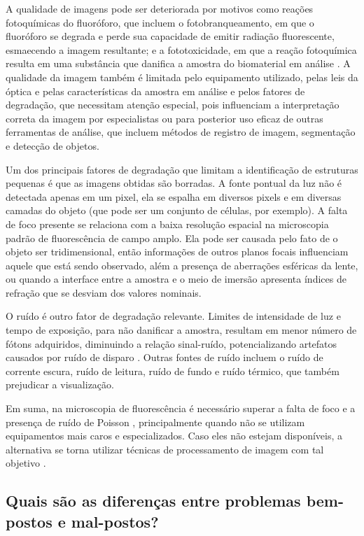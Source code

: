 A qualidade de imagens pode ser deteriorada por motivos como reações fotoquímicas do fluoróforo, que incluem o fotobranqueamento, em que o fluoróforo se degrada e perde sua capacidade de emitir radiação fluorescente, esmaecendo a imagem resultante; e a fototoxicidade, em que a reação fotoquímica resulta em uma substância que danifica a amostra do biomaterial em análise \cite{kubitscheck2017fluorescence}. A qualidade da imagem também é limitada pelo equipamento utilizado, pelas leis da óptica e pelas características da amostra em análise e pelos fatores de degradação, que necessitam atenção especial, pois influenciam a interpretação correta da imagem por especialistas ou para posterior uso eficaz de outras ferramentas de análise, que incluem métodos de registro de imagem, segmentação e detecção de objetos. 

Um dos principais fatores de degradação que limitam a identificação de estruturas pequenas é que as imagens obtidas são borradas. A fonte pontual da luz não é detectada apenas em um pixel, ela se espalha em diversos pixels e em diversas camadas do objeto (que pode ser um conjunto de células, por exemplo). A falta de foco presente se relaciona com a baixa resolução espacial na microscopia padrão de fluorescência de campo amplo. Ela pode ser causada pelo fato de o objeto ser tridimensional, então informações de outros planos focais influenciam aquele que está sendo observado, além a presença de aberrações esféricas da lente, ou quando a interface entre a amostra e o meio de imersão apresenta índices de refração que se desviam dos valores nominais. 

O ruído é outro fator de degradação relevante. Limites de intensidade de luz e tempo de exposição, para não danificar a amostra, resultam em menor número de fótons adquiridos, diminuindo a relação sinal-ruído, potencializando artefatos causados por ruído de disparo \cite {Zhang2019}. Outras fontes de ruído incluem o ruído de corrente escura, ruído de leitura, ruído de fundo \cite{kubitscheck2017fluorescence} e ruído térmico, que também prejudicar a visualização. 

Em suma, na microscopia de fluorescência é necessário superar a falta de foco e a presença de ruído de Poisson \cite{Bertero2009}, principalmente quando não se utilizam equipamentos mais caros e especializados. Caso eles não estejam disponíveis, a alternativa se torna utilizar técnicas de processamento de imagem com tal objetivo \cite{Belthangady2019}.


\subsection{Quais são as diferenças entre problemas bem-postos e mal-postos?}\label{sec:illposedprob}

